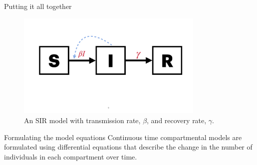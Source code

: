 \documentclass[
  ignorenonframetext,
]{beamer}
\begin{document}
\begin{frame}
\begin{block}{Putting it all together}
\label{putting-it-all-together}
\begin{figure}[H]

{\centering \includegraphics[width=0.8\textwidth,height=\textheight]{images/model_diagrams/model_diagrams.006.jpeg}

}

\caption{An SIR model with transmission rate, \(\beta\), and recovery
rate, \(\gamma\).}

\end{figure}%
\end{block}
\end{frame}

\begin{frame}
\begin{block}{Formulating the model equations}
\label{formulating-the-model-equations}
{Continuous time compartmental} models are formulated using
{differential equations} that describe the change in the number of
individuals in each compartment over time.
\end{block}
\end{frame}
\end{document}
